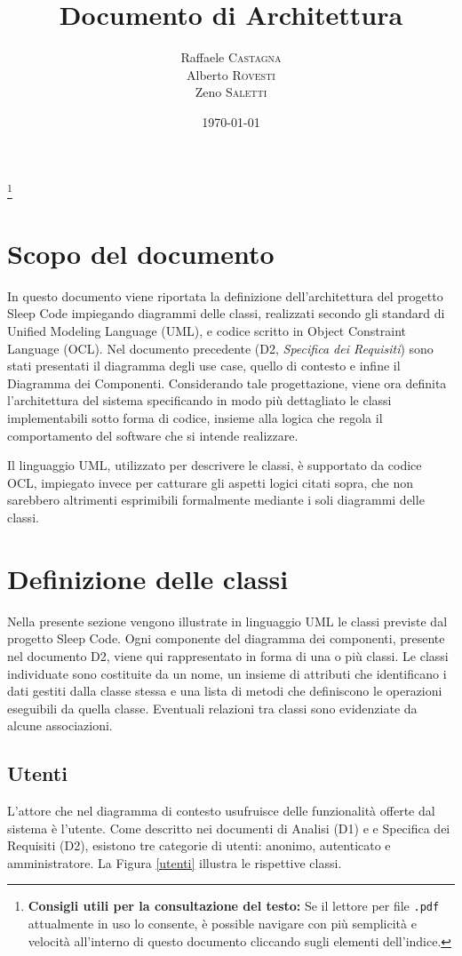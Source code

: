 \documentclass[11pt, a4paper]{article}
\title{Documento di Architettura}
\author{Raffaele \textsc{Castagna}\\
Alberto \textsc{Rovesti}\\
Zeno \textsc{Saletti}}
\date{\today}
\theoremstyle{definition} %
\newcommand\blfootnote[1]{%
  \begingroup
  \renewcommand\thefootnote{}\footnote{#1}%
  \addtocounter{footnote}{-1}%
  \endgroup
}
\begin{document}


\tableofcontents\blfootnote{\textbf{Consigli utili per la consultazione del testo:} Se il lettore per file \texttt{.pdf} attualmente in uso lo consente, è possible navigare con più semplicità e velocità all'interno di questo documento cliccando sugli elementi dell'indice.}

\newpage

\section*{Scopo del documento}
In questo documento viene riportata la definizione dell'architettura del
progetto Sleep Code impiegando diagrammi delle classi, realizzati
secondo gli standard di Unified Modeling Language (UML), e codice scritto in Object
Constraint Language (OCL). Nel documento precedente (D2, \textit{Specifica
dei Requisiti}) sono stati presentati il diagramma degli use case, quello
di contesto e infine il Diagramma dei Componenti. Considerando tale
progettazione, viene ora definita l'architettura del sistema specificando
in modo più dettagliato le classi implementabili sotto forma di
codice, insieme alla logica che regola il comportamento del software che
si intende realizzare.

Il linguaggio UML, utilizzato per descrivere le classi, è supportato da
codice OCL, impiegato invece per catturare gli aspetti logici citati sopra,
che non sarebbero altrimenti esprimibili formalmente mediante i soli diagrammi delle
classi.


\newpage
\section{Definizione delle classi}
Nella presente sezione vengono illustrate in linguaggio UML le classi
previste dal progetto Sleep Code. Ogni componente del diagramma
dei componenti, presente nel documento D2, viene qui rappresentato
in forma di una o più classi. Le classi individuate sono costituite
da un nome, un insieme di attributi che identificano i dati gestiti dalla
classe stessa e una lista di metodi che definiscono le operazioni
eseguibili da quella classe. Eventuali relazioni tra classi sono evidenziate
da alcune associazioni.

\subsection{Utenti}
L'attore che nel diagramma di contesto usufruisce delle funzionalità offerte
dal sistema è l'utente. Come descritto nei documenti di Analisi (D1) e
e Specifica dei Requisiti (D2), esistono tre categorie di utenti: anonimo, autenticato
e amministratore. La Figura \ref{utenti} illustra le rispettive classi.
\end{document}
